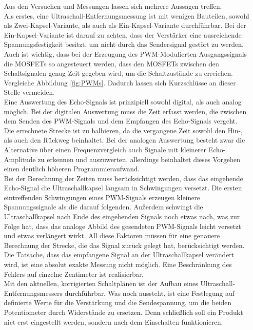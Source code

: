 Aus den Versuchen und Messungen lassen sich mehrere Aussagen treffen. \\
Als erstes, eine Ultraschall-Entfernungsmessung ist mit wenigen Bauteilen, sowohl als Zwei-Kapsel-Variante, als auch als Ein-Kapsel-Variante durchführbar. Bei der Ein-Kapsel-Variante ist darauf zu achten, dass der Verstärker eine ausreichende Spannungsfestigkeit besitzt, um nicht durch das Sendersignal gestört zu werden. Auch ist wichtig, dass bei der Erzeugung des PWM-Modulierten Ausgangssignals die MOSFETs so angesteuert werden, dass den MOSFETs zwischen den Schaltsignalen genug Zeit gegeben wird, um die Schaltzustände zu erreichen. Vergleiche Abbildung \ref{fig:PWMs}. Dadurch lassen sich Kurzschlüsse an dieser Stelle vermeiden.\\
Eine Auswertung des Echo-Signals ist prinzipiell sowohl digital, als auch analog möglich. Bei der digitalen Auswertung muss die Zeit erfasst werden, die zwischen dem Senden des PWM-Signals und dem Empfangen des Echo-Signals vergeht. Die errechnete Strecke ist zu halbieren, da die vergangene Zeit sowohl den Hin-, als auch den Rückweg beinhaltet. Bei der analogen Auswertung besteht zwar die Alternative über einen Frequenzvergleich auch Signale mit kleinerer Echo-Amplitude zu erkennen und auszuwerten, allerdings beinhaltet dieses Vorgehen einen deutlich höheren Programmieraufwand.\\
Bei der Berechnung der Zeiten muss berücksichtigt werden, dass das eingehende Echo-Signal die Ultraschallkapsel langsam in Schwingungen versetzt. Die ersten eintreffenden Schwingungen eines PWM-Signals erzeugen kleinere Spannungssignale als die darauf folgenden. Außerdem schwingt die Ultraschallkapsel nach Ende des eingehenden Signals noch etwas nach, was zur Folge hat, dass das analoge Abbild des gesendeten PWM-Signals leicht versetzt und etwas verlängert wirkt. All diese Faktoren müssen für eine genauere Berechnung der Strecke, die das Signal zurück gelegt hat, berücksichtigt werden. Die Tatsache, dass das empfangene Signal an der Ultraschallkapsel verändert wird, ist eine absolut exakte Messung nicht möglich. Eine Beschränkung des Fehlers auf einzelne Zentimeter ist realisierbar.\\
Mit den aktuellen, korrigierten Schaltplänen ist der Aufbau eines Ultraschall-Entfernungsmessers durchführbar. Was noch aussteht, ist eine Festlegung auf definierte Werte für die Verstärkung und die Sendespannung, um die beiden Potentiometer durch Widerstände zu ersetzen. Denn schließlich soll ein Produkt nict erst eingestellt werden, sondern nach dem Einschalten funktionieren.